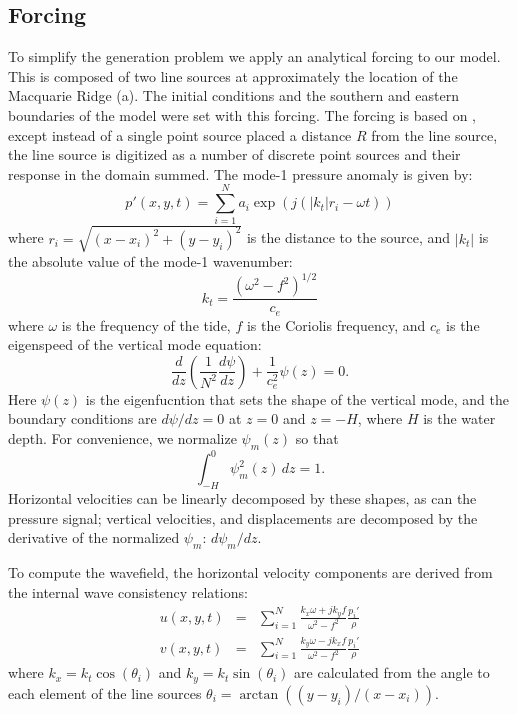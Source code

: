 \documentclass[10pt]{article}
\begin{document}
%
%
%
%
%
%
%

\subsection{Forcing}

To simplify the generation problem we apply an analytical forcing to our model.  This is composed of two line sources at approximately the location of the Macquarie Ridge (a).  The initial conditions and the southern and eastern boundaries of the model were set with this forcing.  The forcing is based on \citep{rainvilleetal10}, except instead of a single point source placed a distance $R$ from the line source, the line source is digitized as a number of discrete point sources and their response in the domain summed.  The mode-1 pressure anomaly is given by:
\begin{equation}
  p'(x,y,t)=\sum_{i=1}^{N}  a_i \exp\left(j\left(|k_t|r_i - \omega t\right)\right)
\end{equation}
where $r_i=\sqrt{\left(x-x_i\right)^2+\left(y-y_i\right)^2}$ is the distance to the source, and $|k_t|$ is the absolute value of the mode-1 wavenumber:
\begin{equation}
  k_t = \frac{\left(\omega^2-f^2\right)^{1/2}}{c_e}
\end{equation}
where $\omega$ is the frequency of the tide, $f$ is the Coriolis frequency, and $c_e$ is the eigenspeed of the vertical mode equation:
\begin{equation}
  \frac{d}{dz}\left(\frac{1}{N^2}\frac{d\psi}{dz}\right)
 + \frac{1}{c_e^2}\psi(z)=0.
\end{equation}
Here $\psi(z)$ is the eigenfucntion that sets the shape of the vertical mode, and the boundary conditions are $d\psi/dz=0$ at $z=0$ and $z=-H$, where $H$ is the water depth.  For convenience, we normalize $\psi_m(z)$ so that 
\begin{equation}
  \int_{-H}^0 \psi_m^2(z)\, dz = 1.
\end{equation}
Horizontal velocities can be linearly decomposed by these shapes, as can the pressure signal; vertical velocities, and displacements are decomposed by the derivative of the normalized $\psi_m$: $d\psi_m/dz$.  

To compute the wavefield, the horizontal velocity components are derived from the internal wave consistency relations: 
\begin{eqnarray}
  u(x,y,t) & = &\sum_{i=1}^{N}  \frac{k_x\omega + j k_y f}{\omega^2-f^2} \frac{p_i'}{\rho}\\
  v(x,y,t) &=& \sum_{i=1}^{N}  \frac{k_y\omega - j k_x f}{\omega^2-f^2} \frac{p_i'}{\rho} 
\end{eqnarray}
where $k_x=k_t\cos(\theta_i)$ and $k_y=k_t\sin(\theta_i)$ are calculated from the angle to  each element of the line sources $\theta_i = \arctan((y-y_i)/(x-x_i))$.  
\end{document}
